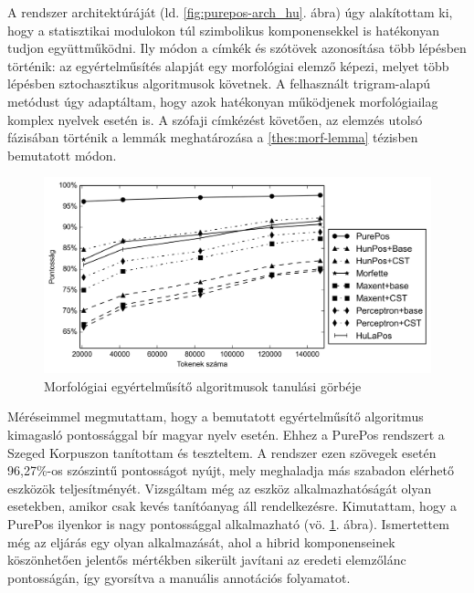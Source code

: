 A rendszer architektúráját  (ld. \ref{fig:purepos-arch_hu}. ábra) úgy alakítottam ki, hogy a statisztikai modulokon túl szimbolikus komponensekkel is hatékonyan tudjon együttműködni. 
Ily módon a címkék és szótövek azonosítása több lépésben történik:
az egyértelműsítés alapját egy morfológiai elemző képezi, melyet több lépésben sztochasztikus algoritmusok követnek. 
A felhasznált trigram-alapú metódust úgy adaptáltam, hogy azok hatékonyan működjenek morfológiailag komplex nyelvek esetén is.
A szófaji címkézést követően, az elemzés utolsó fázisában történik a lemmák meghatározása a \ref{thes:morf-lemma} tézisben bemutatott módon.

\begin{figure} %
  \centering
  \includegraphics[width=1\textwidth]{MorphTagging/humor_token_hu.png}
  \caption{Morfológiai egyértelműsítő algoritmusok tanulási görbéje}
  \label{fig:humor-token_hu}
\end{figure}

Méréseimmel megmutattam, hogy a bemutatott egyértelműsítő algoritmus kimagasló pontossággal bír magyar nyelv esetén. 
Ehhez a PurePos rendszert a Szeged Korpuszon tanítottam és teszteltem. 
A rendszer ezen szövegek esetén 96,27\%-os szószintű pontosságot nyújt, mely meghaladja más szabadon elérhető eszközök teljesítményét.
Vizsgáltam még az eszköz alkalmazhatóságát olyan esetekben, amikor csak kevés tanítóanyag áll rendelkezésre.
Kimutattam, hogy a PurePos ilyenkor is nagy pontossággal alkalmazható (vö. \ref{fig:humor-token_hu}. ábra). 
Ismertettem még az eljárás egy olyan alkalmazását, ahol a hibrid komponenseinek köszönhetően jelentős mértékben sikerült javítani az eredeti elemzőlánc pontosságán, így gyorsítva a manuális annotációs folyamatot.


